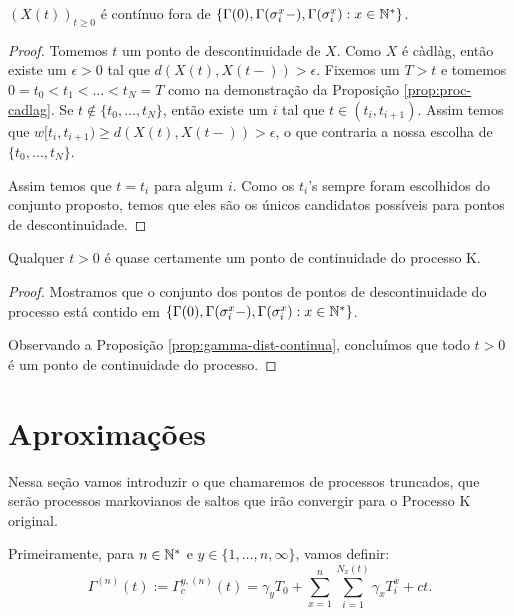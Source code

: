\begin{proposicao}
  \label{prop:proc-descontinuidades}
  $(X(t))_{t\geq 0}$ é \qc contínuo fora de $\{ \Gamma(0),
  \Gamma(\sigma_i^x-), \Gamma(\sigma_i^x): x \in {\mathbb{N^*}}\}$.
\end{proposicao}
\begin{proof}
  Tomemos $t$ um ponto de descontinuidade de $X$. Como $X$ é càdlàg,
  então existe um $\epsilon > 0$ tal que $d(X(t), X(t-)) > \epsilon$.
  Fixemos um $T > t$ e tomemos $0 = t_0 < t_1 < \ldots < t_N = T$ como na
  demonstração da Proposição \ref{prop:proc-cadlag}. Se $t \not\in
  \{t_0, \ldots, t_N\}$, então existe um $i$ tal que $t \in (t_i,
  t_{i+1})$. Assim temos que $w[t_i, t_{i+1}) \geq d(X(t), X(t-)) >
  \epsilon$, o que contraria a nossa escolha de $\{t_0, \ldots, t_N\}$.

  Assim temos que $t = t_i$ para algum $i$. Como os $t_i$'s sempre
  foram escolhidos do conjunto proposto, temos que eles são os únicos
  candidatos possíveis para pontos de descontinuidade.
\end{proof}

\begin{corolario}
  \label{cor:continuidades-processo}
  Qualquer $t > 0$ é quase certamente um ponto de continuidade do
  processo K.
\end{corolario}
\begin{proof}
  Mostramos que o conjunto dos pontos de pontos de descontinuidade do
  processo está contido em $\{ \Gamma(0), \Gamma(\sigma_i^x-),
  \Gamma(\sigma_i^x): x \in {\mathbb{N^*}}\}$.

  Observando a Proposição \ref{prop:gamma-dist-continua}, concluímos
  que todo $t > 0$ é um ponto de continuidade do processo.
\end{proof}



\section{Aproximações}
\label{sec:aproximacoes}

Nessa seção vamos introduzir o que chamaremos de processos truncados,
que serão processos markovianos de saltos que irão convergir para o
Processo K original.

Primeiramente, para $n \in {\mathbb{N^*}}$ e $y \in \{1, \ldots, n, \infty\}$,
vamos definir:
\begin{displaymath}
  \Gamma^{(n)} (t) := \Gamma^{y,(n)}_c (t) = \gamma_y T_0
  + \sum_{x =1}^{n} \sum_{i = 1}^{N_x(t)}
  \gamma_x T_i^x
  + ct.
\end{displaymath}

